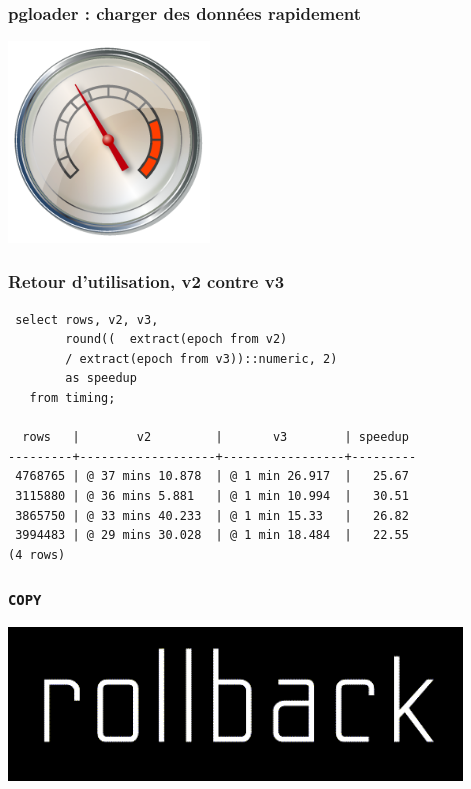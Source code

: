\documentclass{beamer}
\begin{document}
\begin{frame}
  \frametitle{pgloader : charger des données \textbf{rapidement}}

  \begin{center}
    \includegraphics[height=2.1in]{performance-index-00.png}
  \end{center}
\end{frame}

\begin{frame}[fragile]
  \frametitle{Retour d'utilisation, v2 contre v3}

  \begin{verbatim}
 select rows, v2, v3,
        round((  extract(epoch from v2)
        / extract(epoch from v3))::numeric, 2)
        as speedup
   from timing;
        
  rows   |        v2         |       v3        | speedup 
---------+-------------------+-----------------+---------
 4768765 | @ 37 mins 10.878  | @ 1 min 26.917  |   25.67
 3115880 | @ 36 mins 5.881   | @ 1 min 10.994  |   30.51
 3865750 | @ 33 mins 40.233  | @ 1 min 15.33   |   26.82
 3994483 | @ 29 mins 30.028  | @ 1 min 18.484  |   22.55
(4 rows)
  \end{verbatim}
\end{frame}

\begin{frame}
  \frametitle{\texttt{COPY}}

  
  \begin{center}
    \includegraphics[height=1.6in]{rollback-wordmark.png}
  \end{center}
\end{frame}
\end{document}
